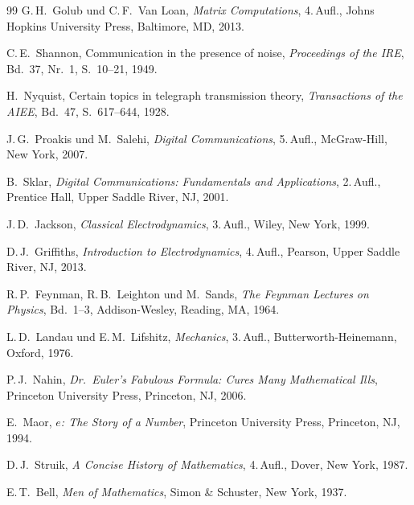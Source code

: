 ﻿\documentclass[a4paper,12pt]{report}
\theoremstyle{definition}
\begin{document}
\begin{thebibliography}{99}
G.\,H.~Golub und C.\,F.~Van Loan,
\textit{Matrix Computations},
4.\,Aufl., Johns Hopkins University Press, Baltimore, MD, 2013.

C.\,E.~Shannon,
Communication in the presence of noise,
\textit{Proceedings of the IRE}, Bd.~37, Nr.~1, S.~10--21, 1949.

H.~Nyquist,
Certain topics in telegraph transmission theory,
\textit{Transactions of the AIEE}, Bd.~47, S.~617--644, 1928.

J.\,G.~Proakis und M.~Salehi,
\textit{Digital Communications},
5.\,Aufl., McGraw-Hill, New York, 2007.

B.~Sklar,
\textit{Digital Communications: Fundamentals and Applications},
2.\,Aufl., Prentice Hall, Upper Saddle River, NJ, 2001.

J.\,D.~Jackson,
\textit{Classical Electrodynamics},
3.\,Aufl., Wiley, New York, 1999.

D.\,J.~Griffiths,
\textit{Introduction to Electrodynamics},
4.\,Aufl., Pearson, Upper Saddle River, NJ, 2013.

R.\,P.~Feynman, R.\,B.~Leighton und M.~Sands,
\textit{The Feynman Lectures on Physics}, Bd.~1--3,
Addison-Wesley, Reading, MA, 1964.

L.\,D.~Landau und E.\,M.~Lifshitz,
\textit{Mechanics},
3.\,Aufl., Butterworth-Heinemann, Oxford, 1976.

P.\,J.~Nahin,
\textit{Dr.\ Euler's Fabulous Formula: Cures Many Mathematical Ills},
Princeton University Press, Princeton, NJ, 2006.

E.~Maor,
\textit{$e$: The Story of a Number},
Princeton University Press, Princeton, NJ, 1994.

D.\,J.~Struik,
\textit{A Concise History of Mathematics},
4.\,Aufl., Dover, New York, 1987.

E.\,T.~Bell,
\textit{Men of Mathematics},
Simon \& Schuster, New York, 1937.

\end{thebibliography}
\end{document}
